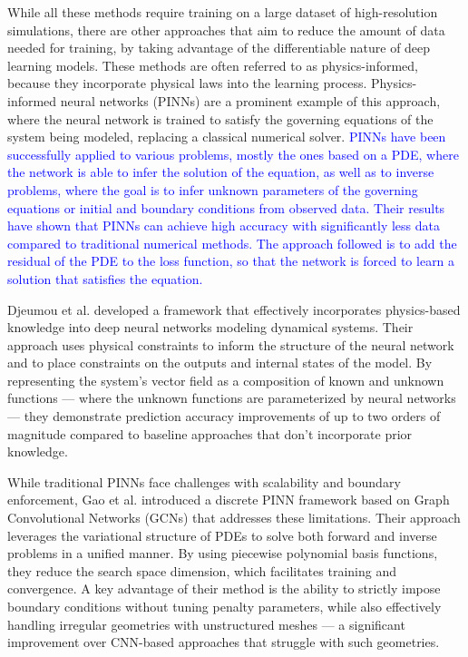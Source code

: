 While all these methods require training on a large dataset of high-resolution simulations, there are other approaches that aim to reduce the amount of data needed for training, by taking advantage of the differentiable nature of deep learning models. These methods are often referred to as physics-informed, because they incorporate physical laws into the learning process. Physics-informed neural networks (PINNs) \cite{raissi2024physicsinformedneuralnetworksextensions} are a prominent example of this approach, where the neural network is trained to satisfy the governing equations of the system being modeled, replacing a classical numerical solver. \textcolor{blue}{PINNs have been successfully applied to various problems, mostly the ones based on a PDE, where the network is able to infer the solution of the equation, as well as to inverse problems, where the goal is to infer unknown parameters of the governing equations or initial and boundary conditions from observed data. Their results have shown that PINNs can achieve high accuracy with significantly less data compared to traditional numerical methods. The approach followed is to add the residual of the PDE to the loss function, so that the network is forced to learn a solution that satisfies the equation. }

Djeumou et al. \cite{djeumouNeuralNetworksPhysicsInformed2022} developed a framework that effectively incorporates physics-based knowledge into deep neural networks modeling dynamical systems. Their approach uses physical constraints to inform the structure of the neural network and to place constraints on the outputs and internal states of the model. By representing the system's vector field as a composition of known and unknown functions — where the unknown functions are parameterized by neural networks — they demonstrate prediction accuracy improvements of up to two orders of magnitude compared to baseline approaches that don't incorporate prior knowledge.

While traditional PINNs face challenges with scalability and boundary enforcement, Gao et al. \cite{gaoPhysicsinformedGraphNeural2022} introduced a discrete PINN framework based on Graph Convolutional Networks (GCNs) that addresses these limitations. Their approach leverages the variational structure of PDEs to solve both forward and inverse problems in a unified manner. By using piecewise polynomial basis functions, they reduce the search space dimension, which facilitates training and convergence. A key advantage of their method is the ability to strictly impose boundary conditions without tuning penalty parameters, while also effectively handling irregular geometries with unstructured meshes — a significant improvement over CNN-based approaches that struggle with such geometries.

